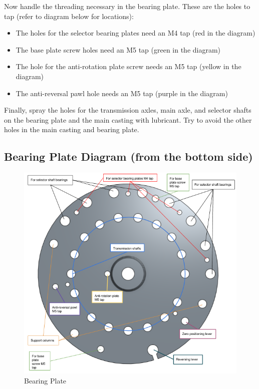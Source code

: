 \documentclass[openany]{book}
\begin{document}
Now handle the threading necessary in the bearing plate. These are the holes to tap (refer to diagram below for locations):
\begin{itemize}
\item The holes for the selector bearing plates need an M4 tap (red in the diagram)
\item The base plate screw holes need an M5 tap (green in the diagram)
\item The hole for the anti-rotation plate screw needs an M5 tap (yellow in the diagram)
\item The anti-reversal pawl hole needs an M5 tap (purple in the diagram)
\end{itemize}

Finally, spray the holes for the transmission axles, main axle, and selector shafts on the bearing plate and the main casting with lubricant. Try to avoid the other holes in the main casting and bearing plate.


\subsection{Bearing Plate Diagram (from the bottom side)}
\begin{figure}[!ht]
	\centering
	\includegraphics[width=\textwidth]{images/image25.png}
	\caption{Bearing Plate}
	\label{fig:image25}	
\end{figure}
\end{document}

